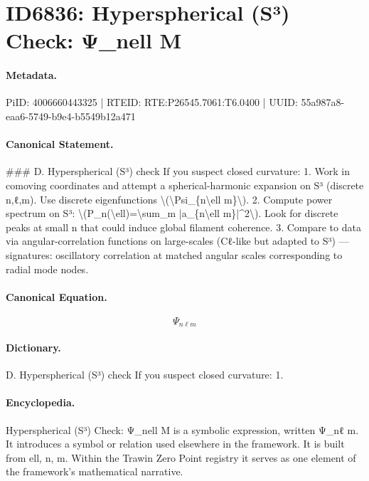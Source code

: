 \section*{ID6836: Hyperspherical (S³) Check: Ψ\_nell M}
\paragraph{Metadata.}
PiID: 4006660443325 | RTEID: RTE:P26545.7061:T6.0400 | UUID: 55a987a8-eaa6-5749-b9e4-b5549b12a471

\paragraph{Canonical Statement.}
\#\#\# D. Hyperspherical (S³) check If you suspect closed curvature: 1. Work in comoving coordinates and attempt a spherical-harmonic expansion on S³ (discrete n,ℓ,m). Use discrete eigenfunctions \textbackslash{}(\textbackslash{}Psi\_\{n\textbackslash{}ell m\}\textbackslash{}). 2. Compute power spectrum on S³: \textbackslash{}(P\_n(\textbackslash{}ell)=\textbackslash{}sum\_m |a\_\{n\textbackslash{}ell m\}|\textasciicircum{}2\textbackslash{}). Look for discrete peaks at small n that could induce global filament coherence. 3. Compare to data via angular-correlation functions on large-scales (Cℓ-like but adapted to S³) — signatures: oscillatory correlation at matched angular scales corresponding to radial mode nodes.

\paragraph{Canonical Equation.}
\[
\Psi_{n\ell m}
\]

\paragraph{Dictionary.}
D. Hyperspherical (S³) check If you suspect closed curvature: 1.

\paragraph{Encyclopedia.}
Hyperspherical (S³) Check: Ψ\_nell M is a symbolic expression, written Ψ\_nℓ m. It introduces a symbol or relation used elsewhere in the framework. It is built from ell, n, m. Within the Trawin Zero Point registry it serves as one element of the framework's mathematical narrative.

